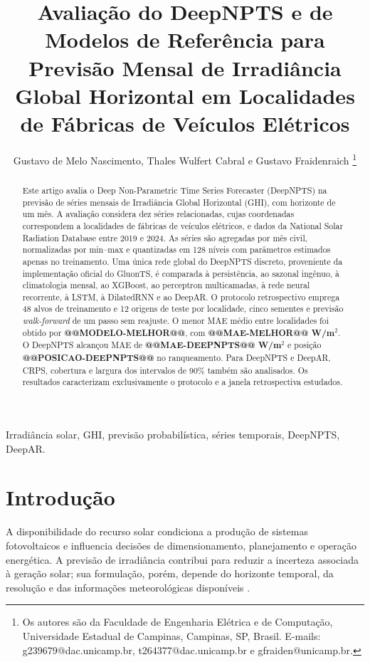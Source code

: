 \documentclass[10pt,conference,a4paper]{IEEEtran}
\title{Avaliação do DeepNPTS e de Modelos de Referência para Previsão Mensal
de Irradiância Global Horizontal em Localidades de Fábricas de Veículos
Elétricos}
\author{Gustavo de Melo Nascimento, Thales Wulfert Cabral e Gustavo Fraidenraich%
\thanks{Os autores são da Faculdade de Engenharia Elétrica e de Computação,
Universidade Estadual de Campinas, Campinas, SP, Brasil. E-mails:
g239679@dac.unicamp.br, t264377@dac.unicamp.br e gfraiden@unicamp.br.}}
\begin{document}
\maketitle

\begin{abstract}
Este artigo avalia o Deep Non-Parametric Time Series Forecaster (DeepNPTS) na
previsão de séries mensais de Irradiância Global Horizontal (GHI), com
horizonte de um mês. A avaliação considera dez séries relacionadas, cujas
coordenadas correspondem a localidades de fábricas de veículos elétricos, e
dados da National Solar Radiation Database entre 2019 e 2024. As séries são
agregadas por mês civil, normalizadas por min--max e quantizadas em 128 níveis
com parâmetros estimados apenas no treinamento. Uma única rede global do
DeepNPTS discreto, proveniente da implementação oficial do GluonTS, é comparada
à persistência, ao sazonal ingênuo, à climatologia mensal, ao XGBoost, ao
perceptron multicamadas, à rede neural recorrente, à LSTM, à DilatedRNN e ao
DeepAR. O protocolo
retrospectivo emprega 48 alvos de treinamento e 12 origens de teste por
localidade, cinco sementes e previsão 
\textit{walk-forward} de um passo sem reajuste. O menor MAE médio entre
localidades foi obtido por \textbf{@@MODELO-MELHOR@@}, com
\textbf{@@MAE-MELHOR@@ W/m$^2$}. O DeepNPTS alcançou MAE de
\textbf{@@MAE-DEEPNPTS@@ W/m$^2$} e posição \textbf{@@POSICAO-DEEPNPTS@@} no
ranqueamento. Para DeepNPTS e DeepAR, CRPS, cobertura e largura dos intervalos
de 90\% também são analisados. Os resultados caracterizam exclusivamente o
protocolo e a janela retrospectiva estudados.
\end{abstract}

\begin{IEEEkeywords}
Irradiância solar, GHI, previsão probabilística, séries temporais, DeepNPTS,
DeepAR.
\end{IEEEkeywords}

\section{Introdução}
\label{sec:introducao}

A disponibilidade do recurso solar condiciona a produção de sistemas
fotovoltaicos e influencia decisões de dimensionamento, planejamento e
operação energética. A previsão de irradiância contribui para reduzir a
incerteza associada à geração solar; sua formulação, porém, depende do horizonte
temporal, da resolução e das informações meteorológicas disponíveis
\cite{antonanzas2016,voyant2017,yang2018}.
\end{document}
